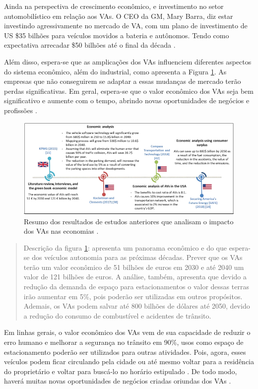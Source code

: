 Ainda na perspectiva de crescimento econômico, e investimento no setor automobilístico em relação aos VAs. O CEO da GM, Mary Barra, diz estar investindo agressivamente no mercado de VA, com um plano de investimento de US \$35 bilhões para veículos movidos a bateria e autônomos. Tendo como expectativa arrecadar \$50 bilhões até o final da década \cite{gm}.

Além disso, espera-se que as amplicações dos VAs influenciem diferentes aspectos do sistema econômico, além do industrial, como apresenta a Figura \ref{figura_resumo}. As empresas que não conseguirem se adaptar a essas mudanças 
 de mercado terão perdas significativas. Em geral, espera-se que o valor econômico dos VAs seja bem significativo e aumente com o tempo, abrindo novas oportunidades de negócios e profissões \cite{mundobrasil}.

\begin{figure}[H]
\centering
\includegraphics[width=\textwidth]{Figures/vas-mercado.png}
\caption{Resumo dos resultados de estudos anteriores que analisam o impacto dos VAs nas economias \cite{mundobrasil}.}
\label{figura_resumo}
\end{figure}

\begin{quote}
Descrição da figura \ref{figura_resumo}: apresenta um panorama econômico e do que espera-se dos veículos autonomia para as próximas décadas. Prever que os VAs terão um valor econômico de 51 bilhões de euros em 2030 e até 2040 um valor de 121 bilhões de euros. A análise, também, apresenta que devido a redução da demanda de espaço para estacionamentos o valor dessas terras irão aumentar em 5\%, pois poderão ser utilizadas em outros propósitos. Ademais, os VAs podem salvar até 800 bilhões de dólares até 2050, devido a redução do consumo de combustível e acidentes de trânsito. 
\end{quote}

Em linhas gerais, o valor econômico dos VAs vem de sua capacidade de reduzir o erro humano e melhorar a segurança no trânsito em 90\%, usos como espaço de estacionamento poderão ser utilizados para outras atividades. Pois, agora, esses veículos podem ficar circulando pela cidade ou até mesmo voltar para a residência do proprietário e voltar para buscá-lo no horário estipulado \cite{4cenarios_ocidental}. De todo modo, haverá muitas novas oportunidades de negócios criadas oriundas dos VAs \cite{mundobrasil}.




